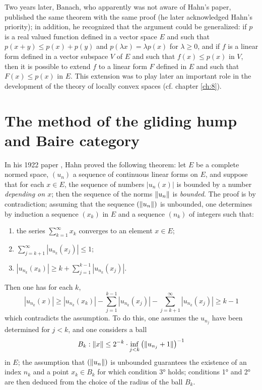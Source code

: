 \documentclass[12pt,a4paper,leqno,twoside]{extbook}
\DeclarePairedDelimiter{\norm}{\lVert}{\rVert}
\begin{document}
Two years later, Banach, who apparently was not aware of Hahn's paper, published the same theorem with the same proof (he later acknowledged Hahn's priority); in addition, he recognized that the argument could be generalized: if \(p\) is a real valued function defined in a vector space \(E\) and such that \(p(x+y) \leq p(x) + p(y)\) and \(p(\lambda x) = \lambda p(x)\) for \(\lambda \geq 0\), and if \(f\) is a linear form defined in a vector subspace \(V\) of \(E\) and such that \(f(x) \leq p(x)\) in \(V\), then it is possible to extend \(f\) to a linear form \(F\) defined in \(E\) and such that \(F(x) \leq p(x)\) in \(E\). This extension was to play later an important role in the development of the theory of locally convex spaces (cf. chapter \ref{ch:8}).

\section{The method of the gliding hump and Baire category}
\label{sec:6.4}

In his 1922 paper \cite{097}, Hahn proved the following theorem: let \(E\) be a complete normed space, \((u_n)\) a sequence of continuous linear forms on \(E\), and suppose that for each \(x \in E\), the sequence of numbers \(|u_n(x)|\) is bounded by a number \emph{depending on \(x\)}; then the sequence of the norms \(\norm{u_n}\) is \emph{bounded}. The proof is by contradiction; assuming that the sequence \((\norm{u_n})\) is unbounded, one determines by induction a sequence \((x_k)\) in \(E\) and a sequence \((n_k)\) of integers such that:
\begin{enumerate}[1°,noitemsep]
    \item the series \(\sum\limits_{k=1}^\infty x_k\) converges to an element \(x \in E\);

    \item \(\sum\limits_{j=k+1}^\infty \left| u_{n_k}(x_j) \right| \leq 1\);

    \item \(\left| u_{n_k}(x_k) \right| \geq k + \sum\limits_{j=1}^{k-1} \left| u_{n_k}(x_j) \right|\).
\end{enumerate}
Then one has for each \(k\),
\[
    \left| u_{n_k}(x) \right| \geq \left| u_{n_k}(x_k) \right| - \sum\limits_{j=1}^{k-1} \left| u_{n_k}(x_j) \right| - \sum\limits_{j=k+1}^{\infty} \left| u_{n_k}(x_j) \right| \geq k-1
\]
which contradicts the assumption. To do this, one assumes the \(u_{n_j}\) have been determined for \(j < k\), and one considers a ball
\[
    B_k: \norm{x} \leq 2^{-k} \cdot \inf_{j < k}\left(\norm{u_{n_j} + 1}\right)^{-1}
\]
in \(E\); the assumption that \((\norm{u_n})\) is unbounded guarantees the existence of an index \(n_k\) and a point \(x_k \in B_k\) for which condition 3° holds; conditions 1° and 2° are then deduced from the choice of the radius of the ball \(B_k\).
\end{document}
